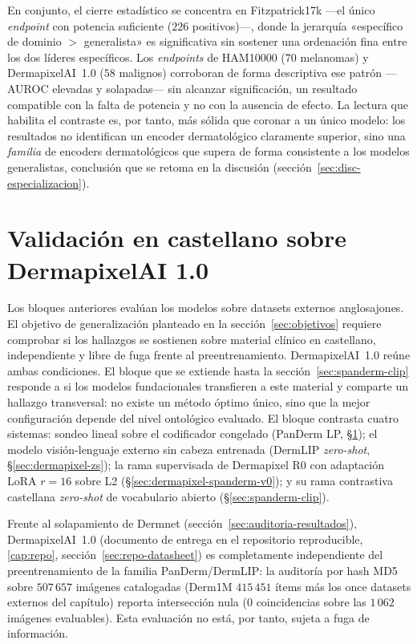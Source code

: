 En conjunto, el cierre estadístico se concentra en Fitzpatrick17k ---el
único \emph{endpoint} con potencia suficiente ($226$ positivos)---,
donde la jerarquía «específico de dominio $>$ generalista» es
significativa sin sostener una ordenación fina entre los dos líderes
específicos. Los \emph{endpoints} de HAM10000 ($70$ melanomas) y
DermapixelAI~1.0 ($58$ malignos) corroboran de forma descriptiva ese
patrón ---AUROC elevadas y solapadas--- sin alcanzar significación, un
resultado compatible con la falta de potencia y no con la ausencia de
efecto. La lectura que habilita el contraste es, por tanto, más sólida
que coronar a un único modelo: los resultados no identifican un encoder
dermatológico claramente superior, sino una \emph{familia} de encoders
dermatológicos que supera de forma consistente a los modelos
generalistas, conclusión que se retoma en la discusión
(sección~\ref{sec:disc-especializacion}).

\section{Validación en castellano sobre DermapixelAI 1.0}
\label{sec:dermapixel-results}

Los bloques anteriores evalúan los modelos sobre datasets externos
anglosajones. El objetivo de generalización planteado en la
sección~\ref{sec:objetivos} requiere comprobar si los hallazgos se
sostienen sobre material clínico en castellano, independiente y libre
de fuga frente al preentrenamiento. DermapixelAI~1.0 reúne ambas
condiciones. El bloque que se extiende hasta la
sección~\ref{sec:spanderm-clip} responde a si los modelos
fundacionales transfieren a este material y comparte un hallazgo
transversal: no existe un método óptimo único, sino que la mejor
configuración depende del nivel ontológico evaluado. El bloque
contrasta cuatro sistemas: sondeo lineal sobre el codificador
congelado (PanDerm LP, §\ref{sec:dermapixel-results}); el modelo
visión-lenguaje externo sin cabeza entrenada (DermLIP \emph{zero-shot},
§\ref{sec:dermapixel-zs}); la rama supervisada de Dermapixel R0 con
adaptación LoRA $r=16$ sobre L2 (§\ref{sec:dermapixel-spanderm-v0}); y
su rama contrastiva castellana \emph{zero-shot} de vocabulario abierto
(§\ref{sec:spanderm-clip}).

Frente al solapamiento de Dermnet
(sección~\ref{sec:auditoria-resultados}), DermapixelAI~1.0
(documento de entrega en el repositorio reproducible, \ref{cap:repo}, sección~\ref{sec:repo-datasheet}) es completamente independiente del
preentrenamiento de la familia PanDerm/DermLIP: la auditoría por hash
MD5 sobre $507\,657$ imágenes catalogadas (Derm1M $415\,451$ ítems más
los once datasets externos del capítulo) reporta intersección nula
($0$ coincidencias sobre las $1\,062$ imágenes evaluables). Esta
evaluación no está, por tanto, sujeta a fuga de información.

